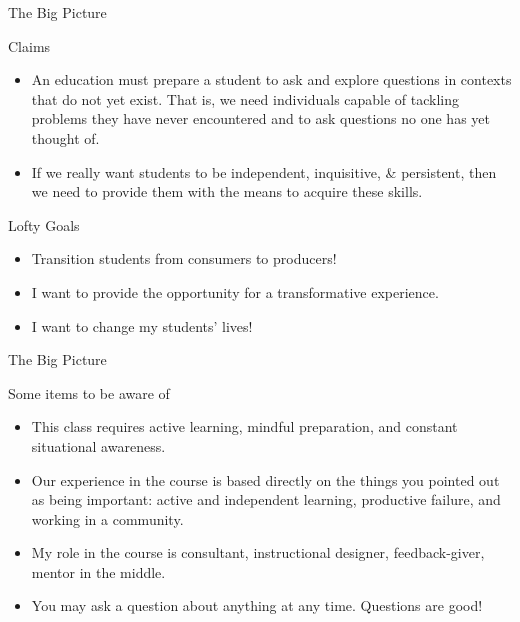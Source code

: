 \documentclass[10pt]{beamer}
\begin{document}
\begin{frame}{The Big Picture}

\vspace{2em}

\begin{block}{Claims}
\vspace{-.75em}
\begin{itemize}
\item An education must prepare a student to ask and explore questions in contexts that do not yet exist. That is, we need individuals capable of tackling problems they have never encountered and to ask questions no one has yet thought of.
\item If we really want students to be independent, inquisitive, \& persistent, then we need to provide them with the means to acquire these skills.
\end{itemize}
\end{block}

\begin{block}{Lofty Goals}
\vspace{-.75em}
\begin{itemize}
\item Transition students from consumers to producers!
\item I want to provide the opportunity for a transformative experience. 
\item I want to change my students' lives!
\end{itemize}
\end{block}

\end{frame}


\begin{frame}{The Big Picture}

\vspace{2em}

\begin{block}{Some items to be aware of}
\vspace{-.75em}
\begin{itemize}
\item This class requires \alert{active learning}, \alert{mindful preparation}, and \alert{constant situational awareness}. 
\item Our experience in the course is based directly on the things you pointed out as being important: \alert{active and independent learning}, \alert{productive failure}, and \alert{working in a community}.  
\item My role in the course is \alert{consultant}, \alert{instructional designer}, \alert{feedback-giver}, \alert{mentor in the middle}. 
\item You may ask a question about anything at any time. Questions are good!
\end{itemize}
\end{block}

\end{frame}
\end{document}
